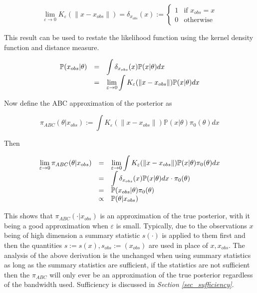 \documentclass[bibliography=totoc,11pt,a4paper,margin=0]{article}
\newcommand*{\prob}{\mathbb{P}}
\theoremstyle{break}
\begin{document}
  \[ \lim_{\varepsilon\to0}K_{\varepsilon}(\|x-x_{obs}\|)=\delta_{x_{obs}}(x):=\begin{cases}1&\text{if }x_{obs}=x\\0&\text{otherwise}\end{cases} \]

  \par This result can be used to restate the likelihood function using the kernel density function and distance measure.

  \[
  \everymath={\displaystyle}
  \begin{array}{rcl}
    \prob(x_{obs}|\theta)&=&\int\delta_{x_{obs}}(x)\prob(x|\theta)dx\\
    &=&\lim_{\varepsilon\to0}\int K_\varepsilon(\|x-x_{obs}\|)\prob(x|\theta)dx
  \end{array}\]

  \par Now define the ABC approximation of the posterior as

  \[ \pi_{ABC}(\theta|x_{obs}):=\int K_\varepsilon(\|x-x_{obs}\|)\prob(x|\theta)\pi_0(\theta)dx \]

  \par Then

  \[
  \everymath={\displaystyle}
  \begin{array}{rcl}
    \lim_{\varepsilon\to0}\pi_{ABC}(\theta|x_{obs})&=&\lim_{\varepsilon\to0}\int K_\varepsilon(\|x-x_{obs}\|)\prob(x|\theta)\pi_0(\theta)dx\\
    &=&\int \delta_{x_{obs}}(x)\prob(x|\theta)dx\cdot \pi_0(\theta)\\
    &=&\prob(x_{obs}|\theta)\pi_0(\theta)\\
    &\propto&\prob(\theta|x_{obs})
  \end{array}\]

  \par This shows that $\pi_{ABC}(\cdot|x_{obs})$ is an approximation of the true posterior, with it being a good approximation when $\varepsilon$ is small. Typically, due to the observations $x$ being of high dimension a summary statistic $s(\cdot)$ is applied to them first and then the quantities $s:=s(x),s_{obs}:=(x_{obs})$ are used in place of $x,x_{obs}$. The analysis of the above derivation is the unchanged when using summary statistics as long as the summary statistics are sufficient, if the statistics are not sufficient then the $\pi_{ABC}$ will only ever be an approximation of the true posterior regardless of the bandwidth used. Sufficiency is discussed in \textit{Section \ref{sec_sufficiency}}.
\end{document}
